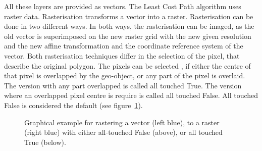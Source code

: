 All these layers are provided as vectors.
The Least Cost Path algorithm uses raster data.
Rasterisation transforms a vector into a raster.
Rasterisation can be done in two different ways.
In both ways, the rasterisation can be imaged, as the old vector is superimposed on the new raster grid with the new
given resolution and the new affine transformation and the coordinate reference system of the vector.
Both rasterisation techniques differ in the selection of the pixel, that describe the original polygon.
The pixels can be selected , if either the centre of that pixel is overlapped
by the geo-object, or any part of the pixel is overlaid.
The version with any part overlapped is called all touched True.
The version where an overlapped pixel centre is require is called all touched False.
All touched False is considered the default (see figure~\ref{fig:alltouched}).
\begin{figure}[!ht]
	\centering

	\vspace*{5mm}
	\caption{Graphical example for rastering a vector (left blue), to a raster (right blue) with either all-touched False (above), or all touched True (below).}
	\label{fig:alltouched}

\end{figure}

